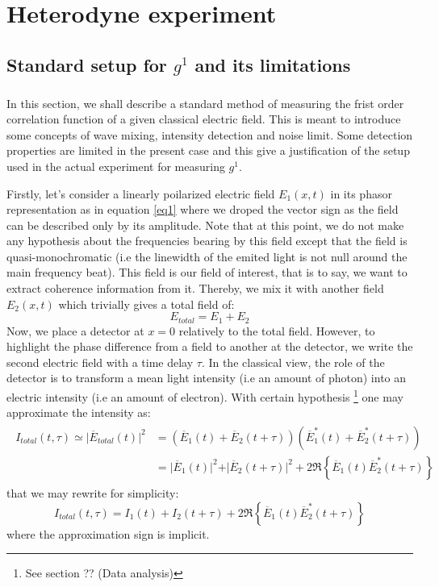 \documentclass[10pt]{report}
\begin{document}
\chapter{Heterodyne experiment}
\section{Standard setup for $g^1$ and its limitations}
\paragraph{}

In this section, we shall describe a standard method of measuring the frist order correlation function of a given classical electric field. This is meant to introduce some concepts of wave mixing, intensity detection and noise limit. Some detection properties are limited in the present case and this give a justification of the setup used in the actual experiment for measuring $g^1$.

Firstly, let's consider a linearly poilarized electric field $E_1(x, t)$ in its phasor representation as in equation \eqref{eq1} where we droped the vector sign as the field can be described only by its amplitude. Note that at this point, we do not make any hypothesis about the frequencies bearing by this field except that the field is quasi-monochromatic (i.e the linewidth of the emited light is not null around the main frequency beat). This field is our field of interest, that is to say, we want to extract coherence information from it. Thereby, we mix it with another field $E_2(x, t)$ which trivially gives a total field of:
\begin{equation}
\label{e_tot_def}
E_{total} = E_1 + E_2
\end{equation}
Now, we place a detector at $x=0$ relatively to the total field. However, to highlight the phase difference from a field to another at the detector, we write the second electric field with a time delay $\tau$. In the classical view, the role of the detector is to transform a mean light intensity (i.e an amount of photon) into an electric intensity (i.e an amount of electron). With certain hypothesis \footnote{See section ?? (Data analysis)} one may approximate the intensity as:
\begin{align}
\begin{split}
I_{total}(t, \tau) \simeq \vert\overline{E}_{total}(t)\vert^2 &= (\overline{E}_1(t) + \overline{E}_2(t + \tau))(\overline{E}_1^*(t) + \overline{E}_2^*(t + \tau))\\
&= \vert \overline{E}_1(t) \vert^2 + \vert \overline{E}_2(t + \tau) \vert^2 + 2\Re\left\lbrace \overline{E}_1(t)\overline{E}_2^*(t + \tau)\right\rbrace
\end{split}
\end{align}
that we may rewrite for simplicity:
\begin{equation}
I_{total}(t, \tau) = I_1(t) + I_2(t + \tau) + 2\Re\left\lbrace \overline{E}_1(t) \overline{E}_2^*(t + \tau)\right\rbrace
\end{equation}
where the approximation sign is implicit.
\end{document}
